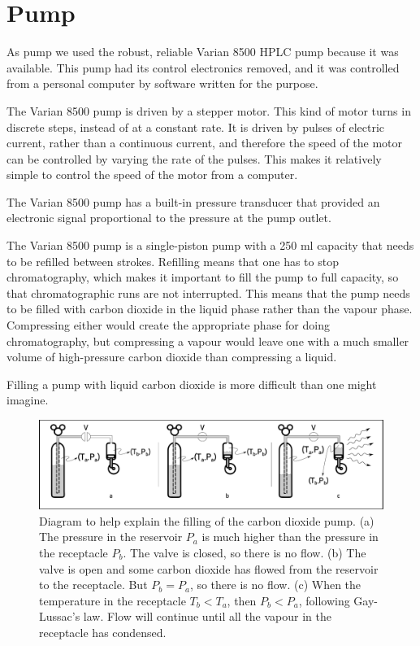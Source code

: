 \section{Pump}

As pump we used the robust, reliable Varian 8500 HPLC pump because it was
available. This pump had its control electronics removed, and it was controlled
from a personal computer by software written for the purpose.

The Varian 8500 pump is driven by a stepper motor. This kind of motor turns in
discrete steps, instead of at a constant rate. It is driven by pulses of
electric current, rather than a continuous current, and therefore the speed of
the motor can be controlled by varying the rate of the pulses. This makes it
relatively simple to control the speed of the motor from a computer.

The Varian 8500 pump has a built-in pressure transducer that provided an
electronic signal proportional to the pressure at the pump outlet.

The Varian 8500 pump is a single-piston pump with a 250 \si{\milli\litre} capacity that
needs to be refilled between strokes. Refilling means that one has to stop
chromatography, which makes it important to fill the pump to full capacity, so
that chromatographic runs are not interrupted. This means that the pump needs to
be filled with carbon dioxide in the liquid phase rather than the vapour phase.
Compressing either would create the appropriate phase for doing chromatography,
but compressing a vapour would leave one with a much smaller volume of
high-pressure carbon dioxide than compressing a liquid.

Filling a pump with liquid carbon dioxide is more difficult than one might
imagine. 


\begin{figure}
\centering
\includegraphics[width=\textwidth]{Figures/CO2Filling.pdf}
\decoRule

\caption[Fillng a CO\textsubscript{2}]{Diagram to help explain the filling of
the carbon dioxide pump. (a) The pressure in the reservoir $P_a$ is much higher
than the pressure in the receptacle $P_b$. The valve is closed, so there is no
flow. (b) The valve is open and some carbon dioxide has flowed from the
reservoir to the receptacle. But $P_b = P_a$, so there is no flow. (c) When the
temperature in the receptacle $T_b < T_a$, then $P_b  < P_a$, following
Gay-Lussac's law. Flow will continue until all the vapour in the receptacle has
condensed.}

\label{fig:co2fill}
\end{figure}



